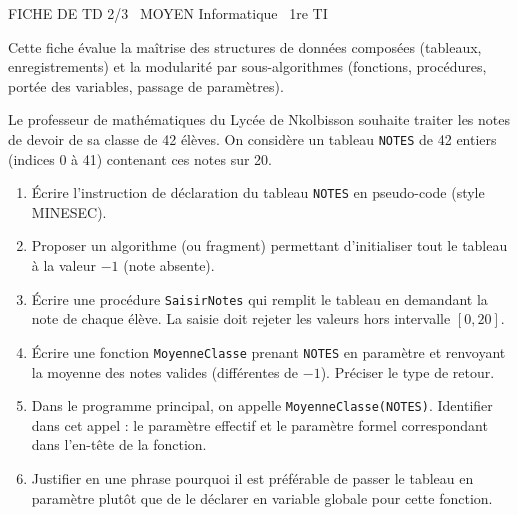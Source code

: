 \documentclass[11pt]{article}
\begin{document}
\begin{tcolorbox}[enhanced,colback=popink,colframe=popink,arc=10pt,boxrule=0pt,left=12pt,right=12pt,top=9pt,bottom=9pt]
{\color{white}\popxbold\small FICHE DE TD 2/3 \textbullet\ MOYEN \hfill Informatique \textbullet\ 1re TI\par}
\end{tcolorbox}
\vspace{4pt}
Cette fiche évalue la maîtrise des structures de données composées (tableaux, enregistrements) et la modularité par sous-algorithmes (fonctions, procédures, portée des variables, passage de paramètres).

\begin{exercice}
Le professeur de mathématiques du Lycée de Nkolbisson souhaite traiter les notes de devoir de sa classe de 42 élèves. On considère un tableau \texttt{NOTES} de 42 entiers (indices 0 à 41) contenant ces notes sur 20.
\begin{enumerate}
    \item Écrire l'instruction de déclaration du tableau \texttt{NOTES} en pseudo-code (style MINESEC).
    \item Proposer un algorithme (ou fragment) permettant d'initialiser tout le tableau à la valeur $-1$ (note absente).
    \item Écrire une procédure \texttt{SaisirNotes} qui remplit le tableau en demandant la note de chaque élève. La saisie doit rejeter les valeurs hors intervalle $[0, 20]$.
    \item Écrire une fonction \texttt{MoyenneClasse} prenant \texttt{NOTES} en paramètre et renvoyant la moyenne des notes valides (différentes de $-1$). Préciser le type de retour.
    \item Dans le programme principal, on appelle \texttt{MoyenneClasse(NOTES)}. Identifier dans cet appel : le paramètre effectif et le paramètre formel correspondant dans l'en-tête de la fonction.
    \item Justifier en une phrase pourquoi il est préférable de passer le tableau en paramètre plutôt que de le déclarer en variable globale pour cette fonction.
\end{enumerate}
\end{exercice}
\end{document}
